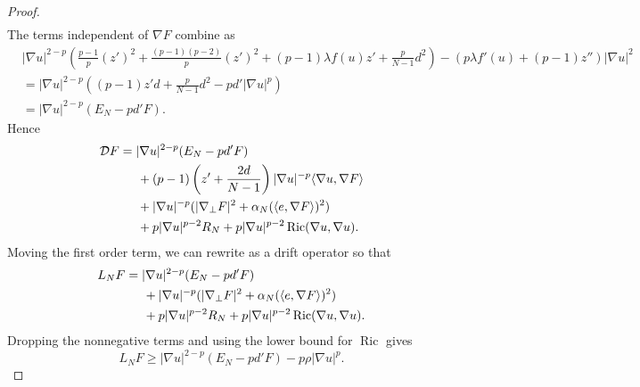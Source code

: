 \documentclass[11pt]{amsart}
\def \hsp {\hspace{0.2 in}}
\DeclareMathOperator{\Ric}{Ric}
\theoremstyle{definition}
\begin{document}
\begin{proof}
\begin{align*}
\end{align*}
The terms independent of $\nabla F$ combine as
\begin{align*}
    &|\nabla u|^{2-p}\left(\frac{p-1}{p}(z')^2+\frac{(p-1)(p-2)}{p}(z')^2+(p-1)\lambda f(u)z'+\frac{p}{N-1}d^2\right)-(p\lambda f'(u)+(p-1)z'')|\nabla u|^2\\
    &=|\nabla u|^{2-p}\left((p-1)z'd+\frac{p}{N-1}d^2-pd'|\nabla u|^p\right)\\
    &=|\nabla u|^{2-p}(E_N-pd'F).
\end{align*}
Hence
\begin{align*}
    \mathcal{D}F&= |\nabla u|^{2-p}(E_N-pd'F)\\
    &\hsp+(p-1)\left(z'+\frac{2d}{N-1}\right)|\nabla u|^{-p}\langle \nabla u,\nabla F\rangle\\
    &\hsp+|\nabla u|^{-p}(|\nabla_\perp F|^2+\alpha_N(\langle e,\nabla F\rangle)^2)\\
    &\hsp+p|\nabla u|^{p-2}R_N+p|\nabla u|^{p-2}\Ric(\nabla u,\nabla u).
\end{align*}
Moving the first order term, we can rewrite as a drift operator so that
\begin{align*}
    L_NF&=|\nabla u|^{2-p}(E_N-pd'F)\\
    &\hsp+|\nabla u|^{-p}(|\nabla_\perp F|^2+\alpha_N(\langle e,\nabla F\rangle)^2)\\
    &\hsp+p|\nabla u|^{p-2}R_N+p|\nabla u|^{p-2}\Ric(\nabla u,\nabla u).
\end{align*}
Dropping the nonnegative terms and using the lower bound for $\Ric$ gives
\begin{equation}
    L_NF \geq |\nabla u|^{2-p}(E_N-pd'F)-p\rho|\nabla u|^p.
\end{equation}
\end{proof}
\end{document}
